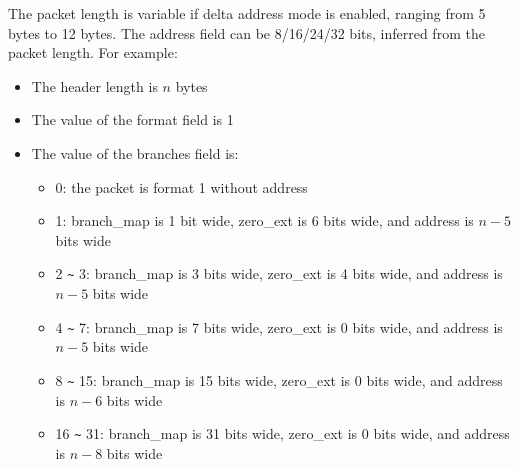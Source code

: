 \documentclass[main\_\_EN.tex]{subfiles}
\begin{document}
The packet length is variable if delta address mode is enabled, ranging from 5 bytes to 12 bytes. The address field can be 8/16/24/32 bits, inferred from the packet length. For example:
\begin{itemize}
    \item The header length is $n$ bytes
    \item The value of the format field is 1
    \item The value of the branches field is:
        \begin{itemize}
            \item 0: the packet is format 1 without address
            \item 1: branch\_map is 1 bit wide, zero\_ext is 6 bits wide, and address is $n-5$ bits wide
            \item 2 \verb+~+ 3:  branch\_map is 3 bits wide, zero\_ext is 4 bits wide, and address is $n-5$ bits wide
            \item 4 \verb+~+ 7: branch\_map is 7 bits wide, zero\_ext is 0 bits wide, and address is $n-5$ bits wide
            \item 8 \verb+~+ 15: branch\_map is 15 bits wide, zero\_ext is 0 bits wide, and address is $n-6$ bits wide
            \item 16 \verb+~+ 31: branch\_map is 31 bits wide, zero\_ext is 0 bits wide, and address is $n-8$ bits wide
        \end{itemize}
\end{itemize}
\end{document}
